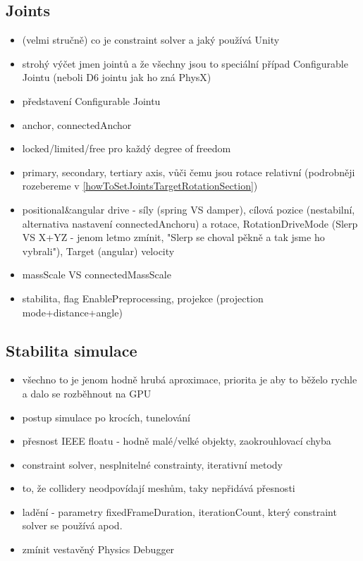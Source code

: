 \subsection{Joints}


\begin{itemize}
    \item (velmi stručně) co je constraint solver a jaký používá Unity
    \item strohý výčet jmen jointů a že všechny jsou to speciální případ Configurable Jointu (neboli D6 jointu jak ho zná PhysX)
    \item představení Configurable Jointu
    \item anchor, connectedAnchor
    \item locked/limited/free pro každý degree of freedom
    \item primary, secondary, tertiary axis, vůči čemu jsou rotace relativní (podrobněji rozebereme v \ref{howToSetJointsTargetRotationSection})
    \item positional\&angular drive - síly (spring VS damper), cílová pozice (nestabilní, alternativa nastavení connectedAnchoru) a rotace, RotationDriveMode (Slerp VS X+YZ - jenom letmo zmínit, "Slerp se choval pěkně a tak jsme ho vybrali"), Target (angular) velocity
    \item massScale VS connectedMassScale
    \item stabilita, flag EnablePreprocessing, projekce (projection mode+distance+angle)
\end{itemize}


\subsection{Stabilita simulace}
\begin{itemize}
    \item všechno to je jenom hodně hrubá aproximace, priorita je aby to běželo rychle a dalo se rozběhnout na GPU
    \item postup simulace po krocích, tunelování
    \item přesnost IEEE floatu - hodně malé/velké objekty, zaokrouhlovací chyba
    \item constraint solver, nesplnitelné constrainty, iterativní metody
    \item to, že collidery neodpovídají meshům, taky nepřidává přesnosti
    \item ladění - parametry fixedFrameDuration, iterationCount, který constraint solver se používá apod.
    \item zmínit vestavěný Physics Debugger
\end{itemize}



